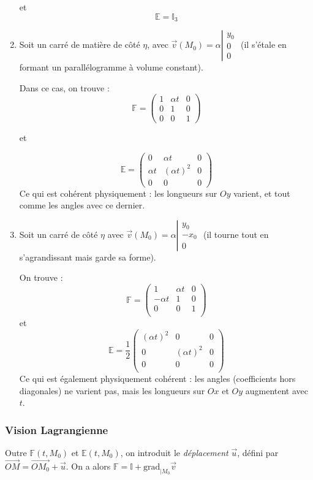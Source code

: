 \documentclass{article}
\begin{document}
\begin{enumerate}
et
\[\mathbb{E} = \mathbb{I}_3\]


\item
Soit un carré de matière de côté $\eta$, avec $\vec{v}(M_0)=\alpha \left\lvert \begin{matrix}
y_0\\0\\0
\end{matrix}\right. $ (il s'étale en formant un parallélogramme à volume constant).

Dans ce cas, on trouve : 
\[\mathbb{F} = \begin{pmatrix}
1 & \alpha t & 0\\
0 & 1 & 0\\
0 & 0 & 1
\end{pmatrix}
\]

et

\[\mathbb{E}= \begin{pmatrix}
0 & \alpha t & 0\\
\alpha t & (\alpha t)^2 & 0\\
0 & 0 & 0
\end{pmatrix}
\]
Ce qui est cohérent physiquement : les longueurs sur $Oy$ varient, et tout comme les angles avec ce dernier.

\item Soit un carré de côté $\eta$ avec $\vec{v}(M_0)=\alpha \left\lvert \begin{matrix}
y_0\\-x_0\\0
\end{matrix}\right.$ (il tourne tout en s'agrandissant mais garde sa forme).


On trouve :
\[\mathbb{F} = \begin{pmatrix}
1 & \alpha t & 0\\
-\alpha t & 1 & 0\\
0 & 0 & 1\\
\end{pmatrix}
\]
et
\[
\mathbb{E} = \dfrac{1}{2}\begin{pmatrix}
(\alpha t)^2 & 0 & 0\\
0 & (\alpha t)^2 & 0\\
0 & 0 & 0\\
\end{pmatrix}
\]
Ce qui est également physiquement cohérent : les angles (coefficients hors diagonales) ne varient pas, mais les longueurs sur $Ox$ et $Oy$ augmentent avec $t$.
\end{enumerate}

\subsubsection{Vision Lagrangienne}
Outre $\mathbb{F}(t,M_0)$ et $\mathbb{E}(t, M_0)$, on introduit le \emph{déplacement} $\vec{u}$, défini par $\overrightarrow{OM}=\overrightarrow{OM_0}+\vec{u}$. On a alors $\mathbb{F}= \mathbb{I} + \text{grad}_{| M_0} \vec{v}$
\end{document}
